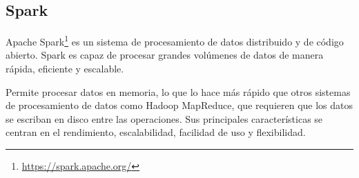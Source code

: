 \subsection{Spark}

Apache Spark\footnote{\url{https://spark.apache.org/}} es un sistema de procesamiento de datos distribuido y de código abierto. Spark es capaz de procesar grandes volúmenes de datos de manera rápida, eficiente y escalable.

Permite procesar datos en memoria, lo que lo hace más rápido que otros sistemas de procesamiento de datos como Hadoop MapReduce, que requieren que los datos se escriban en disco entre las operaciones. Sus principales características se centran en el rendimiento, escalabilidad, facilidad de uso y flexibilidad.
